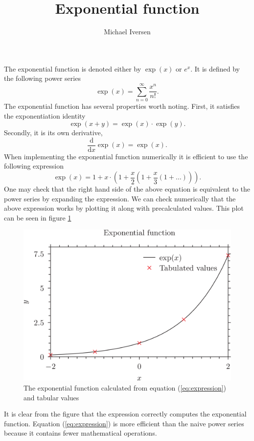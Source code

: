 \documentclass{article}
\title{Exponential function}
\author{Michael Iversen}
\begin{document}
\maketitle
The exponential function is denoted either by $\exp(x)$ or $e^x$. It is defined by the following power series
\begin{equation}
\exp(x) = \sum_{n=0}^\infty \frac{x^n}{n!}.
\end{equation}
The exponential function has several properties worth noting. First, it satisfies the exponentiation identity
\begin{equation}
\exp(x + y) = \exp(x) \cdot \exp(y).
\end{equation}
Secondly, it is its own derivative,
\begin{equation}
\frac{\mathrm d}{\mathrm dx} \exp(x) = \exp(x).
\end{equation}
When implementing the exponential function numerically it is efficient to use the following expression
\begin{equation}\label{eq:expression}
\exp(x) = 1 + x \cdot \left( 1 + \frac{x}{2} \left( 1 + \frac{x}{3} \left ( 1 + \ldots \right)\right)\right).
\end{equation}
One may check that the right hand side of the above equation is equivalent to the power series by expanding the expression.
We can check numerically that the above expression works by plotting it along with precalculated values. This plot can be seen in figure \ref{fig:exp}
\begin{figure}
\centering
\includegraphics{ex.png}
\caption{The exponential function calculated from equation (\ref{eq:expression}) and tabular values}
\label{fig:exp}
\end{figure}
It is clear from the figure that the expression correctly computes the exponential function. 
Equation (\ref{eq:expression}) is more efficient than the naive power series because it contains fewer mathematical operations.
\end{document}

